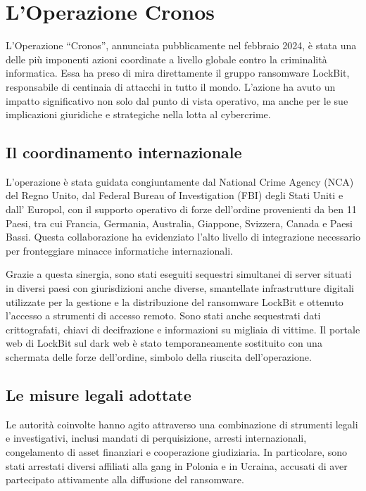 \documentclass[a4paper,12pt]{article}
\begin{document}
\section{L'Operazione Cronos}
L’Operazione “Cronos”, annunciata pubblicamente nel febbraio 2024, è stata una delle più imponenti azioni coordinate a livello globale contro la criminalità informatica. Essa ha preso di mira direttamente il gruppo ransomware LockBit, responsabile di centinaia di attacchi in tutto il mondo. L’azione ha avuto un impatto significativo non solo dal punto di vista operativo, ma anche per le sue implicazioni giuridiche e strategiche nella lotta al cybercrime.

\subsection{Il coordinamento internazionale}
L'operazione è stata guidata congiuntamente dal National Crime Agency (NCA) del Regno Unito, dal Federal Bureau of Investigation (FBI) degli Stati Uniti e dall' Europol, con il supporto operativo di forze dell’ordine provenienti da ben 11 Paesi, tra cui Francia, Germania, Australia, Giappone, Svizzera, Canada e Paesi Bassi. Questa collaborazione ha evidenziato l’alto livello di integrazione necessario per fronteggiare minacce informatiche internazionali.

Grazie a questa sinergia, sono stati eseguiti sequestri simultanei di server situati in diversi paesi con giurisdizioni anche diverse, smantellate infrastrutture digitali utilizzate per la gestione e la distribuzione del ransomware LockBit e ottenuto l'accesso a strumenti di accesso remoto. Sono stati anche sequestrati dati crittografati, chiavi di decifrazione e informazioni su migliaia di vittime. Il portale web di LockBit sul dark web è stato temporaneamente sostituito con una schermata delle forze dell’ordine, simbolo della riuscita dell’operazione.

\subsection{Le misure legali adottate}
Le autorità coinvolte hanno agito attraverso una combinazione di strumenti legali e investigativi, inclusi mandati di perquisizione, arresti internazionali, congelamento di asset finanziari e cooperazione giudiziaria. In particolare, sono stati arrestati diversi affiliati alla gang in Polonia e in Ucraina, accusati di aver partecipato attivamente alla diffusione del ransomware.
\end{document}
